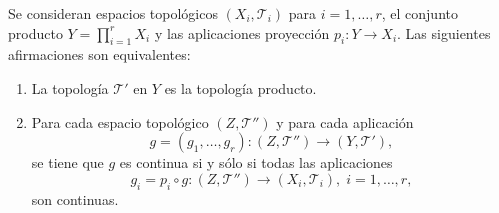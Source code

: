 \begin{prop}
Se consideran espacios topológicos $\displaystyle \left(X_{i}, \mathcal{T}_{i}\right) $ para $\displaystyle i = 1, \ldots, r $, el conjunto producto $\displaystyle Y = \prod^{r}_{i=1}X_{i} $ y las aplicaciones proyección $\displaystyle p_{i} : Y \to X_{i} $. Las siguientes afirmaciones son equivalentes:
\begin{enumerate}
\item La topología $\displaystyle \mathcal{T}' $ en $\displaystyle Y $ es la topología producto.
\item Para cada espacio topológico $\displaystyle \left(Z, \mathcal{T}''\right) $ y para cada aplicación 
	\[g = \left(g_{1}, \ldots, g_{r}\right) : \left(Z, \mathcal{T}''\right)\to \left(Y, \mathcal{T}'\right) ,\]
	se tiene que $\displaystyle g $ es continua si y sólo si todas las aplicaciones 
	\[g_{i} = p_{i}\circ g : \left(Z, \mathcal{T}''\right)\to \left(X_{i}, \mathcal{T}_{i}\right), \; i = 1, \ldots, r ,\]
	son continuas.
\end{enumerate}
\end{prop}
